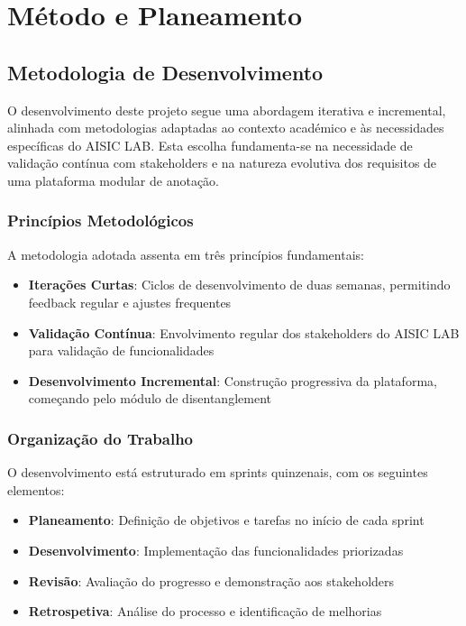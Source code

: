 \chapter{Método e Planeamento}

\section{Metodologia de Desenvolvimento}

O desenvolvimento deste projeto segue uma abordagem iterativa e incremental, alinhada com metodologias adaptadas ao contexto académico e às necessidades específicas do AISIC LAB. Esta escolha fundamenta-se na necessidade de validação contínua com stakeholders e na natureza evolutiva dos requisitos de uma plataforma modular de anotação.

\subsection{Princípios Metodológicos}

A metodologia adotada assenta em três princípios fundamentais:

\begin{itemize}
    \item \textbf{Iterações Curtas}: Ciclos de desenvolvimento de duas semanas, permitindo feedback regular e ajustes frequentes
    \item \textbf{Validação Contínua}: Envolvimento regular dos stakeholders do AISIC LAB para validação de funcionalidades
    \item \textbf{Desenvolvimento Incremental}: Construção progressiva da plataforma, começando pelo módulo de disentanglement
\end{itemize}

\subsection{Organização do Trabalho}

O desenvolvimento está estruturado em sprints quinzenais, com os seguintes elementos:

\begin{itemize}
    \item \textbf{Planeamento}: Definição de objetivos e tarefas no início de cada sprint
    \item \textbf{Desenvolvimento}: Implementação das funcionalidades priorizadas
    \item \textbf{Revisão}: Avaliação do progresso e demonstração aos stakeholders
    \item \textbf{Retrospetiva}: Análise do processo e identificação de melhorias
\end{itemize}

